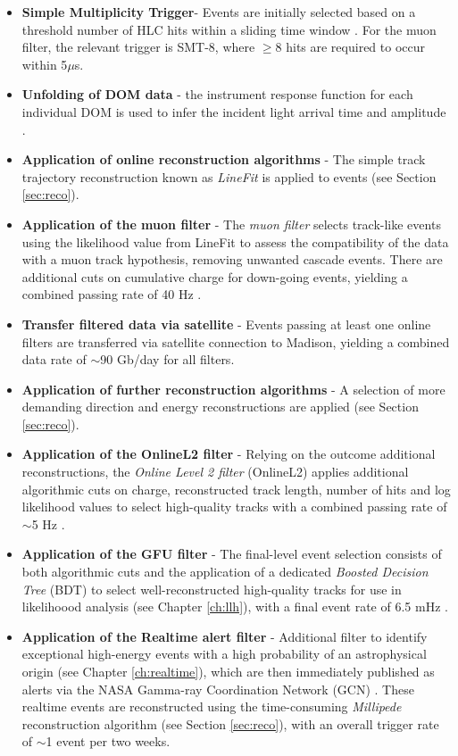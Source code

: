 \begin{itemize}
	\item \textbf{Simple Multiplicity Trigger}- Events are initially selected based on a threshold number of HLC hits within a sliding time window \cite{icecube_detector_17}. For the muon filter, the relevant trigger is SMT-8, where $\geq$8 hits are required to occur within 5$\mu$s.
	\item \textbf{Unfolding of DOM data} - the instrument response function for each individual DOM is used to infer the incident light arrival time and amplitude \cite{icecube_detector_17}.
	\item \textbf{Application of online reconstruction algorithms} - The simple track trajectory reconstruction known as \emph{LineFit} is applied to events (see Section \ref{sec:reco}).
	\item \textbf{Application of the muon filter} - The \emph{muon filter} selects track-like events using the likelihood value from LineFit to assess the compatibility of the data with a muon track hypothesis, removing unwanted cascade events. There are additional cuts on cumulative charge for down-going events, yielding a combined passing rate of 40 Hz \cite{kintscher_thesis}.
	\item \textbf{Transfer filtered data via satellite } - Events passing at least one online filters are transferred via satellite connection to Madison, yielding a combined data rate of $\sim$90 Gb/day for all filters.
	\item \textbf{Application of further reconstruction algorithms} - A selection of more demanding direction and energy reconstructions are applied (see Section \ref{sec:reco}).
	\item \textbf{Application of the OnlineL2 filter} - Relying on the outcome additional reconstructions, the \emph{Online Level 2 filter} (OnlineL2) applies additional algorithmic cuts on charge, reconstructed track length, number of hits and log likelihood values to select high-quality tracks with a combined passing rate of $\sim$5 Hz .	
	\item \textbf{Application of the GFU filter} - The final-level event selection consists of both algorithmic cuts and the application of a dedicated \emph{Boosted Decision Tree} (BDT) to select well-reconstructed high-quality tracks for use in likelihoood analysis (see Chapter \ref{ch:llh}), with a final event rate of 6.5 mHz \cite{kintscher_thesis}.
	\item \textbf{Application of the Realtime alert filter} - Additional filter to identify exceptional high-energy events with a high probability of an astrophysical origin (see Chapter \ref{ch:realtime}), which are then immediately published as alerts via the NASA Gamma-ray Coordination Network (GCN) . These realtime events are reconstructed using the time-consuming \emph{Millipede} reconstruction algorithm (see Section \ref{sec:reco}), with an overall trigger rate of $\sim$1 event per two weeks.
\end{itemize}

